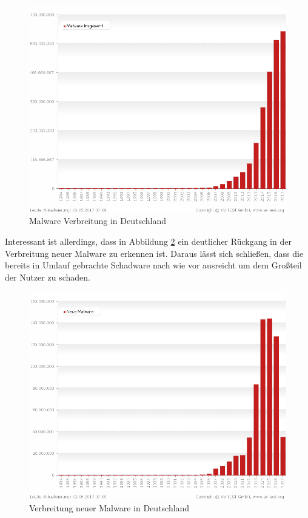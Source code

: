 \begin{figure}[H]
  \centering
  \includegraphics[width=14cm]{images/malware-all-years_sum_de}
  \caption[Malware Verbreitung in Deutschland]{Malware Verbreitung in Deutschland\protect\footnotemark}
  \label{fig:malware}
\end{figure}

Interessant ist allerdings, dass in Abbildung \ref{fig:malware-new} ein deutlicher Rückgang in der
Verbreitung neuer Malware zu erkennen ist. Daraus lässt sich schließen, dass die bereits
in Umlauf gebrachte Schadware nach wie vor ausreicht um dem Großteil der Nutzer zu schaden.

\begin{figure}[H]
  \centering
  \includegraphics[width=14cm]{images/malware-all-years_de}
  \caption[Verbreitung neuer Malware in Deutschland]{Verbreitung neuer Malware in Deutschland\protect\footnotemark}
  \label{fig:malware-new}
\end{figure}


